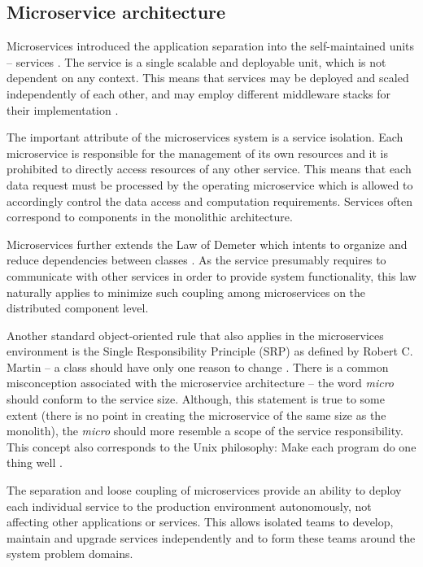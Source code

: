 \documentclass[oneside,
  digital, %
  table,   %
  nolof,     %
  nolot,     %
]{fithesis3}
\begin{document}
\subsection{Microservice architecture}

Microservices introduced the application separation into the self-maintained units – services \cite{intro_to_microservices}. The service is a single scalable and deployable unit, which is not dependent on any context. This means that services may be deployed and scaled independently of each other, and may employ different middleware   stacks for their implementation \cite{ms_arch_ecommerce}. 

The important attribute of the microservices system is a service isolation. Each microservice is responsible for the management of its own resources and it is prohibited to directly access resources of any other service. This means that each data request must be processed by the operating microservice which is allowed to accordingly control the data access and computation requirements. Services often correspond to components in the monolithic architecture.

Microservices further extends the Law of Demeter which intents to organize and reduce dependencies between classes \cite{law_of_demeter}. As the service presumably requires to communicate with other services in order to provide system functionality, this law naturally applies to minimize such coupling among microservices on the distributed component level. 

Another standard object-oriented rule that also applies in the microservices environment is the Single Responsibility Principle (SRP) as defined by Robert C. Martin -- a class should have only one reason to change \cite{agile_ppp_c}. There is a common misconception associated with the microservice architecture -- the word \textit{micro} should conform to the service size. Although, this statement is true to some extent (there is no point in creating the microservice of the same size  as the monolith), the \textit{micro} should more resemble a scope of the service responsibility. This concept also corresponds to the Unix philosophy: Make each program do one thing well \cite{unix_time_sharing_foreword}.

The separation and loose coupling of microservices provide an ability to deploy each individual service to the production environment autonomously, not affecting other applications or services. This allows isolated teams to develop, maintain and upgrade services independently and to form these teams around the system problem domains. 
\end{document}

